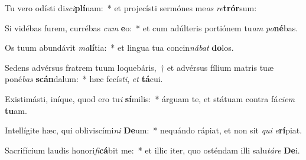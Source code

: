 \item Tu vero odísti di\textit{sci}\textbf{plí}nam:~* et projecísti sermónes me\textit{os} \textit{re}\textbf{trór}sum:
\item Si vidébas furem, currébas \textit{cum} \textbf{e}o:~* et cum adúlteris portiónem tu\textit{am} \textit{po}\textbf{né}bas.
\item Os tuum abundávit \textit{ma}\textbf{lí}tia:~* et lingua tua concin\textit{ná}\textit{bat} \textbf{do}los.
\item Sedens advérsus fratrem tuum loquebáris,~† et advérsus fílium matris tuæ poné\textit{bas} \textbf{scán}dalum:~* hæc fecís\textit{ti}, \textit{et} \textbf{tá}cui.
\item Existimásti, iníque, quod ero tu\textit{i} \textbf{sí}milis:~* árguam te, et státuam contra fá\textit{ci}\textit{em} \textbf{tu}am.
\item Intellígite hæc, qui obliviscími\textit{ni} \textbf{De}um:~* nequándo rápiat, et non sit \textit{qui} \textit{e}\textbf{rí}piat.
\item Sacrifícium laudis honori\textit{fi}\textbf{cá}bit me:~* et illic iter, quo osténdam illi salu\textit{tá}\textit{re} \textbf{De}i.
